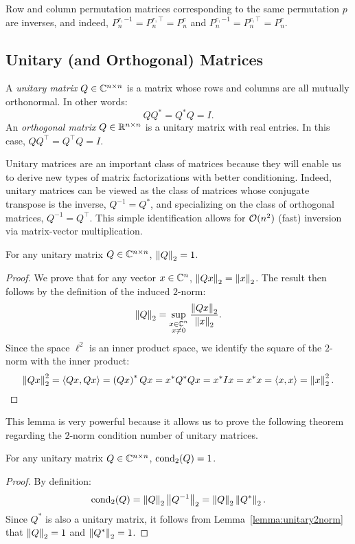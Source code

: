 Row and column permutation matrices corresponding to the same permutation $p$ are inverses, and indeed, $P_n^{r,-1} = P_n^{r,\top} = P_n^c$ and $P_n^{c,-1} = P_n^{c,\top} = P_n^r$.

\subsection{Unitary (and Orthogonal) Matrices}

\begin{definition}
A {\em unitary matrix} $Q\in\mathbb{C}^{n\times n}$ is a matrix whose rows and columns are all mutually orthonormal. In other words:
\[
QQ^* = Q^* Q = I.
\]
An {\em orthogonal matrix} $Q\in\mathbb{R}^{n\times n}$ is a unitary matrix with real entries. In this case, $QQ^\top = Q^\top Q = I$.
\end{definition}

Unitary matrices are an important class of matrices because they will enable us to derive new types of matrix factorizations with better conditioning. Indeed, unitary matrices can be viewed as the class of matrices whose conjugate transpose is the inverse, $Q^{-1} = Q^*$, and specializing on the class of orthogonal matrices, $Q^{-1} = Q^\top$. This simple identification allows for $\mathcal{O}(n^2)$ (fast) inversion via matrix-vector multiplication.

\begin{lemma}\label{lemma:unitary2norm}
For any unitary matrix $Q\in\mathbb{C}^{n\times n}$, $\left\|{Q}\right\|_2=1$.
\end{lemma}
\begin{proof}
We prove that for any vector $x\in\mathbb{C}^n$, $\left\|{Qx}\right\|_2 = \left\|{x}\right\|_2$. The result then follows by the definition of the induced $2$-norm:
\[
\left\|{Q}\right\|_2 = \sup_{\substack{x\in\mathbb{C}^n\\x\ne0}}\dfrac{\left\|{Qx}\right\|_2}{\left\|{x}\right\|_2}.
\]
Since the space $\ell^2$ is an inner product space, we identify the square of the $2$-norm with the inner product:
\[
\norm{Qx}_2^2 = \langle Qx,Qx\rangle = \pr(Qx)^*Qx = x^*Q^*Qx = x^*Ix = x^*x = \langle x,x\rangle = \norm{x}_2^2.
\]
\end{proof}
This lemma is very powerful because it allows us to prove the following theorem regarding the $2$-norm condition number of unitary matrices.
\begin{theorem}
For any unitary matrix $Q\in\mathbb{C}^{n\times n}$, $\operatorname{cond}_2(Q)=1$.
\end{theorem}
\begin{proof}
By definition:
\[
\operatorname{cond}_2(Q) = \left\|{Q}\right\|_2\left\|{Q^{-1}}\right\|_2 = \left\|{Q}\right\|_2\left\|{Q^*}\right\|_2.
\]
Since $Q^*$ is also a unitary matrix, it follows from Lemma~\ref{lemma:unitary2norm} that $\left\|{Q}\right\|_2 = 1$ and $\left\|{Q^*}\right\|_2 = 1$.
\end{proof}

